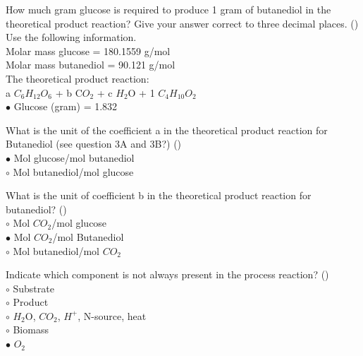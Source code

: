 \documentclass[]{beamer}
\begin{document}
\begin{frame}[shrink] {} 
\color{blue}
How much gram glucose is required to produce 1 gram of butanediol in the theoretical product reaction? Give your answer correct to three decimal places. 
 ({\color{green}{Q3c}})\\
Use the following information.
\\[0.5em]
\color{gray}
Molar mass glucose = 180.1559 g/mol\\
Molar mass butanediol = 90.121 g/mol\\
\color{blue}
The theoretical product reaction:\\
\color{gray}
a $C_{6}$$H_{12}$$O_{6}$ + b C$O_{2}$ + c $H_{2}$O + 1 $C_{4}$$H_{10}$$O_{2}$  \\[1em]
\color{black}
\setlength{\parindent}{-0.4cm}
{\color{red}$\bullet$} Glucose (gram) = 1.832\\
\end{frame}


\begin{frame}[shrink] {} 
\color{blue}
  What is the unit of the coefficient a in the theoretical product reaction for Butanediol (see question 3A and 3B?)
 ({\color{green}{Q3d}})\\
\color{black}
\setlength{\parindent}{-0.4cm}
{\color{red}$\bullet$} Mol glucose/mol butanediol  \\
{\color{red}$\circ$} Mol butanediol/mol glucose  \\
\end{frame}


\begin{frame}[shrink] {} 
\color{blue}
  What is the unit of coefficient b in the theoretical product reaction for butanediol?
 ({\color{green}{Q3e}})\\
\color{black}
\setlength{\parindent}{-0.4cm}
{\color{red}$\circ$} Mol $CO_{2}$/mol glucose  \\
{\color{red}$\bullet$} Mol $CO_{2}$/mol Butanediol  \\
{\color{red}$\circ$} Mol butanediol/mol $CO_{2}$  \\
\end{frame}


\begin{frame}[shrink] {} 
\color{blue}
    Indicate which component is not always present in the process reaction?
 ({\color{green}{Q4a}})\\
\color{black}
\setlength{\parindent}{-0.4cm}
{\color{red}$\circ$} Substrate  \\
{\color{red}$\circ$} Product  \\
{\color{red}$\circ$} $H_{2}$O, $CO_{2}$, $H^{+}$, N-source, heat  \\
{\color{red}$\circ$} Biomass  \\
{\color{red}$\bullet$} $O_{2}$  \\
\end{frame}
\end{document}
